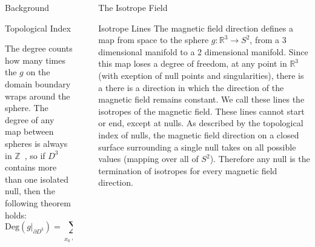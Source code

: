 \documentclass[final]{beamer}
\newlength{\sepwid}
\newlength{\onecolwid}
\begin{document}
\begin{frame}[t]
\begin{columns}[t]
\begin{column}{\onecolwid}
\begin{block}{\huge{Background}}
\begin{block}{Topological Index}
{\begin{minipage}{\textwidth}
\begin{equation}
    \end{equation}
    The degree counts how many times the $g$ on the domain boundary wraps around the sphere.
    The degree of any map between spheres is always in
    $\mathbb{Z}$~\cite{brouwer1911abbildung}, so 
    if $D^3$ contains more than one isolated null, then the following theorem holds:
    \begin{equation}\label{eq:indextheorem}
        \mathrm{Deg}(g|_{\partial D^3})= \sum_{x_0\in D^3} \mathrm{Ind}(x_0)
    \end{equation}
    \end{minipage}
    }
\end{block}
\end{block}


\end{column} %


\begin{column}{\sepwid}\end{column} %

\begin{column}{\onecolwid} %


%

\begin{block}{\huge{The Isotrope Field}}
\begin{block}{Isotrope Lines}
  The magnetic field direction defines a map from space to the sphere $g:\mathbb{R}^3\rightarrow S^2$,
  from a 3 dimensional manifold to a 2 dimensional manifold.
  Since this map loses a degree of freedom,
  at any point in $\mathbb{R}^3$ (with exeption of null points and singularities),
  there is a there is a direction in which the direction
  of the magnetic field remains constant.
  We call these lines the isotropes of the magnetic field.
  These lines cannot start or end, except at nulls.
  As described by the topological index of nulls, the magnetic field direction
  on a closed surface surrounding a single null takes on all possible values (mapping over all of $S^2$).
  Therefore any null is the termination of isotropes for every magnetic field direction.
\end{block}


\end{block}
\end{column}
\end{columns}
\end{frame}
\end{document}
